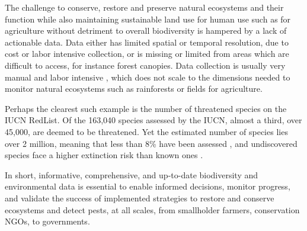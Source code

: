 The challenge to conserve, restore and preserve natural ecosystems and their function while also maintaining sustainable land use for human use such as for agriculture without detriment to overall biodiversity is hampered by a lack of actionable data. Data either has limited spatial or temporal resolution, due to cost or labor intensive collection, or is missing  or limited from areas which are difficult to access, for instance forest canopies. Data collection is usually very manual and labor intensive \cite{Cannon2021}, which does not scale to the dimensions needed to monitor natural ecosystems such as rainforests or fields for agriculture. 

Perhaps the clearest such example is the number of threatened species on the IUCN RedList. Of the 163,040 species assessed by the IUCN, almost a third, over 45,000, are deemed to be threatened. Yet the estimated number of species lies over 2 million, meaning that less than 8\% have been assessed \cite{IUCN2024}, and undiscovered species face a higher extinction risk than known ones \cite{Liu2022a}.




In short, informative, comprehensive, and up-to-date biodiversity and environmental data is essential to enable informed decisions, monitor progress, and validate the success of implemented strategies to restore and conserve ecosystems and detect pests, at all scales, from smallholder farmers, conservation NGOs, to governments. 

